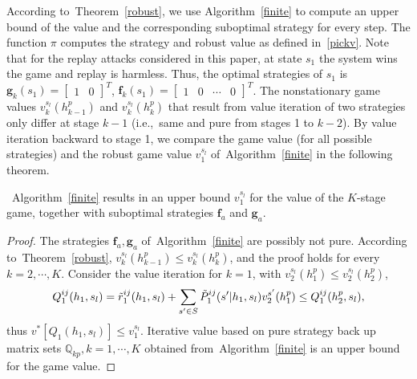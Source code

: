 According to~Theorem~\ref{robust}, we use Algorithm~\ref{finite} to compute an upper bound of the value and the corresponding suboptimal strategy for every step. The %
function $\pi$ computes the strategy and robust value as defined in~\eqref{pickv}. Note that for the replay attacks considered in this paper, at state $s_{1}$ the system wins the game and replay is harmless. Thus, the optimal strategies of $s_{1}$ is $\mathbf{g}_{k}(s_{1})=\begin{bmatrix}1&0\end{bmatrix}^{T}$, $\mathbf{f}_{k}(s_{1})=\begin{bmatrix}1&0&\cdots&0\end{bmatrix}^{T}$. 
The nonstationary game values $v_k^{s_l}(h^p_{k-1})$ and $v_k^{s_l}(h^p_k)$ that result from value iteration of two strategies only differ at stage $k-1$ (i.e.,~same and pure from stages 1 to $k-2$). By value iteration backward to stage 1, we compare the game value (for all possible strategies) and the robust game value $v_1^{s_l}$ of~Algorithm~\ref{finite} in the following theorem.
\begin{theorem}
~Algorithm~\ref{finite} results  in an upper bound $v_{1}^{s_{l}}$ for the value of the $K$-stage game, together with suboptimal strategies $\mathbf{f}_{a}$ and $\mathbf{g}_{a}$. 
\end{theorem}
\vspace{3pt}
\begin{proof}
The strategies $\mathbf{f}_{a}, \mathbf{g}_{a}$ of~Algorithm~\ref{finite} are possibly not pure. %
According to~Theorem~\ref{robust}, $v_{k}^{s_{l}}(h^{p}_{k-1})\leq v^{s_{l}}_{k}(h_{k}^{p})$, %
and the proof holds for every $k=2,\cdots,K$.  \iffalse Using induction,\fi Consider the value iteration for $k=1$, with $v_{2}^{s_{l}}(h^{p}_{1})\leq v^{s_{l}}_{2}(h_{2}^{p})$, 
\footnotesize
\begin{equation*}
\vspace{-5pt}
Q_1^{ij}(h_1, s_l)=\tilde{r}_1^{ij}(h_1,s_l)+\sum\limits_{s'\in S}\tilde{P}^{ij}_{1}(s'|h_{1},s_{l})v^{s'}_{2}(h^p_{1})\leq Q_1^{ij}(h_2^p,s_l),
\end{equation*}
\normalsize
thus $v^{*}[Q_1(h_1, s_l)] \leq v^{s_{l}}_{1}$.  Iterative value based on pure strategy back up matrix sets $\mathbb{Q}_{kp}, k=1,\cdots, K$ obtained from~Algorithm~\ref{finite} is an upper bound for the game value.
\end{proof}

